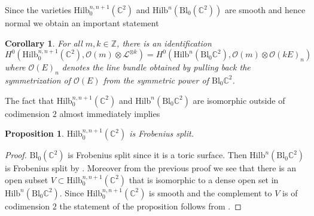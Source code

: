 \documentclass[12pt]{amsart}
\newcommand{\Hilb}{\mathrm{Hilb}}
\newcommand{\C}{\mathbb{C}}
\newcommand{\Z}{\mathbb{Z}}
\newcommand{\CL}{\mathcal{L}}
\newcommand{\CO}{\mathcal{O}}
\newcommand{\Bl}{\mathrm{Bl}}
\numberwithin{equation}{section}
\newtheorem{proposition}[theorem]{Proposition}
\newtheorem{corollary}[theorem]{Corollary}
\theoremstyle{definition}
\begin{document}


Since the varieties \(\Hilb_0^{n,n+1}(\C^2)\) and \(\Hilb^n(\Bl_0(\C^2))\) are smooth and hence normal we obtain an important statement

\begin{corollary}
\label{cor:birationalequiv}
    For all $m,k\in \Z$, there is an identification
    \[ H^0(\Hilb^{n,n+1}_0(\C^2),\CO(m)\otimes \CL^{\otimes k}) = H^0(\Hilb^n (\mathrm{Bl}_0 \C^2),\CO(m)\otimes \CO(kE)_n)  \]
    where $\CO(E)_n$ denotes the line bundle obtained by pulling back the symmetrization of $\CO(E)$ from the symmetric power of $\mathrm{Bl}_0 \C^2$.
\end{corollary}

The fact that \(\Hilb^{n,n+1}_0(\C^2)\) and \(\Hilb^n(\mathrm{Bl}_0\C^2 )\) are isomorphic outside of  codimension \(2\) almost immediately
implies
\begin{proposition}
  \(\Hilb^{n,n+1}_0(\C^2)\) is Frobenius split.
\end{proposition}
\begin{proof}
  \(\Bl_0(\C^2)\) is Frobenius split since it is a toric surface. Then \(\Hilb^n(\Bl_0\C^2)\) is Frobenius split by \cite[Theorem 7.5.2]{BrionKumar}. Moreover from the previous proof we see that there is an open subset \(V\subset \Hilb^{n,n+1}_0(\C^2)\) that is isomorphic to a dense
  open set in \(\Hilb^n(\Bl_0\C^2)\). Since \(\Hilb^{n,n+1}_0(\C^2)\) is smooth and the complement to \(V\) is of codimension \(2\) the
  statement of the proposition follows from \cite[Lemma 1.1.7]{BrionKumar}.
\end{proof}
\end{document}
